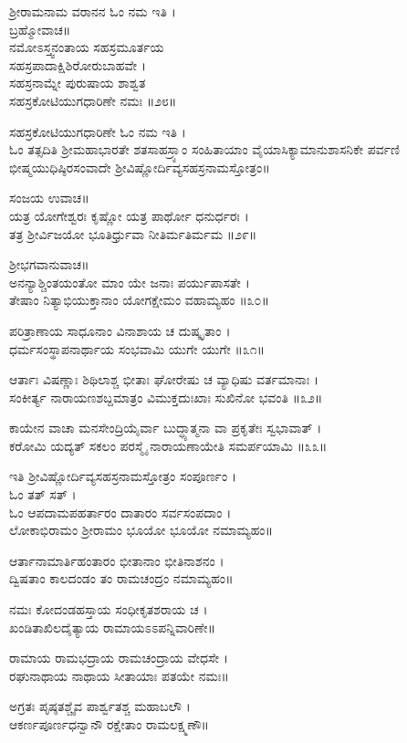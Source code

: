 ಶ್ರೀರಾಮನಾಮ ವರಾನನ ಓಂ ನಮ ಇತಿ ।\\
ಬ್ರಹ್ಮೋವಾಚ॥\\
ನಮೋಽಸ್ತ್ವನಂತಾಯ ಸಹಸ್ರಮೂರ್ತಯ\\
ಸಹಸ್ರಪಾದಾಕ್ಷಿಶಿರೋರುಬಾಹವೇ ।\\
ಸಹಸ್ರನಾಮ್ನೇ ಪುರುಷಾಯ ಶಾಶ್ವತ\\
ಸಹಸ್ರಕೋಟಿಯುಗಧಾರಿಣೇ ನಮಃ ॥೨೮॥

ಸಹಸ್ರಕೋಟಿಯುಗಧಾರಿಣೇ ಓಂ ನಮ ಇತಿ ।\\

ಓಂ ತತ್ಸದಿತಿ ಶ್ರೀಮಹಾಭಾರತೇ ಶತಸಾಹಸ್ರ್ಯಾಂ ಸಂಹಿತಾಯಾಂ ವೈಯಾಸಿಕ್ಯಾಮಾನುಶಾಸನಿಕೇ ಪರ್ವಣಿ ಭೀಷ್ಮಯುಧಿಷ್ಠಿರಸಂವಾದೇ ಶ್ರೀವಿಷ್ಣೋರ್ದಿವ್ಯಸಹಸ್ರನಾಮಸ್ತೋತ್ರಂ॥

ಸಂಜಯ ಉವಾಚ॥\\
ಯತ್ರ ಯೋಗೇಶ್ವರಃ ಕೃಷ್ಣೋ ಯತ್ರ ಪಾರ್ಥೋ ಧನುರ್ಧರಃ ।\\
ತತ್ರ ಶ್ರೀರ್ವಿಜಯೋ ಭೂತಿರ್ಧ್ರುವಾ ನೀತಿರ್ಮತಿರ್ಮಮ ॥೨೯॥

ಶ್ರೀಭಗವಾನುವಾಚ॥\\
ಅನನ್ಯಾಶ್ಚಿಂತಯಂತೋ ಮಾಂ ಯೇ ಜನಾಃ ಪರ್ಯುಪಾಸತೇ ।\\
ತೇಷಾಂ ನಿತ್ಯಾಭಿಯುಕ್ತಾನಾಂ ಯೋಗಕ್ಷೇಮಂ ವಹಾಮ್ಯಹಂ ॥೩೦॥

ಪರಿತ್ರಾಣಾಯ ಸಾಧೂನಾಂ ವಿನಾಶಾಯ ಚ ದುಷ್ಕೃತಾಂ ।\\
ಧರ್ಮಸಂಸ್ಥಾಪನಾರ್ಥಾಯ ಸಂಭವಾಮಿ ಯುಗೇ ಯುಗೇ ॥೩೧॥

ಆರ್ತಾಃ ವಿಷಣ್ಣಾಃ ಶಿಥಿಲಾಶ್ಚ ಭೀತಾಃ ಘೋರೇಷು ಚ ವ್ಯಾಧಿಷು ವರ್ತಮಾನಾಃ ।\\
ಸಂಕೀರ್ತ್ಯ ನಾರಾಯಣಶಬ್ದಮಾತ್ರಂ ವಿಮುಕ್ತದುಃಖಾಃ ಸುಖಿನೋ ಭವಂತಿ ॥೩೨॥

ಕಾಯೇನ ವಾಚಾ ಮನಸೇಂದ್ರಿಯೈರ್ವಾ ಬುದ್ಧ್ಯಾತ್ಮನಾ ವಾ ಪ್ರಕೃತೇಃ ಸ್ವಭಾವಾತ್ ।\\
ಕರೋಮಿ ಯದ್ಯತ್ ಸಕಲಂ ಪರಸ್ಮೈ ನಾರಾಯಣಾಯೇತಿ ಸಮರ್ಪಯಾಮಿ ॥೩೩॥

ಇತಿ ಶ್ರೀವಿಷ್ಣೋರ್ದಿವ್ಯಸಹಸ್ರನಾಮಸ್ತೋತ್ರಂ ಸಂಪೂರ್ಣಂ ।\\
ಓಂ ತತ್ ಸತ್ ।\\

ಓಂ ಆಪದಾಮಪಹರ್ತಾರಂ ದಾತಾರಂ ಸರ್ವಸಂಪದಾಂ ।\\
ಲೋಕಾಭಿರಾಮಂ ಶ್ರೀರಾಮಂ ಭೂಯೋ ಭೂಯೋ ನಮಾಮ್ಯಹಂ॥

ಆರ್ತಾನಾಮಾರ್ತಿಹಂತಾರಂ ಭೀತಾನಾಂ ಭೀತಿನಾಶನಂ ।\\
ದ್ವಿಷತಾಂ ಕಾಲದಂಡಂ ತಂ ರಾಮಚಂದ್ರಂ ನಮಾಮ್ಯಹಂ॥

ನಮಃ ಕೋದಂಡಹಸ್ತಾಯ ಸಂಧೀಕೃತಶರಾಯ ಚ ।\\
ಖಂಡಿತಾಖಿಲದೈತ್ಯಾಯ ರಾಮಾಯಽಽಪನ್ನಿವಾರಿಣೇ॥

ರಾಮಾಯ ರಾಮಭದ್ರಾಯ ರಾಮಚಂದ್ರಾಯ ವೇಧಸೇ ।\\
ರಘುನಾಥಾಯ ನಾಥಾಯ ಸೀತಾಯಾಃ ಪತಯೇ ನಮಃ॥

ಅಗ್ರತಃ ಪೃಷ್ಠತಶ್ಚೈವ ಪಾರ್ಶ್ವತಶ್ಚ ಮಹಾಬಲೌ ।\\
ಆಕರ್ಣಪೂರ್ಣಧನ್ವಾನೌ ರಕ್ಷೇತಾಂ ರಾಮಲಕ್ಷ್ಮಣೌ॥

